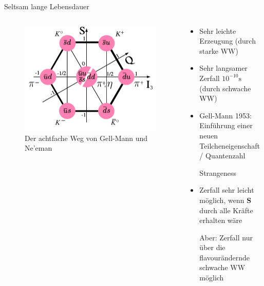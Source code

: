 \documentclass[aspectratio=1610, professionalfonts, 9pt, t]{beamer}
\begin{document}
  \begin{frame}{Seltsam lange Lebensdauer}
    \begin{columns}[onlytextwidth]
      \begin{column}{0.4\textwidth}
        \begin{figure}[ht]
          \begin{center}
            \includegraphics[height=0.6\textheight]{Images/Meson-octet.png} %
            \caption{Der achtfache Weg von Gell-Mann und Ne'eman}
          \end{center}
        \end{figure}
      \end{column}
      \begin{column}{0.5\textwidth}
        \begin{itemize}
          \item Sehr leichte Erzeugung (durch starke WW)
          \item Sehr langsamer Zerfall $10^{-10}\si{\second}$ (durch schwache WW)
          \item Gell-Mann 1953: Einführung einer neuen Teilcheneigenschaft/ Quantenzahl \item[\rightarrow] Strangeness
          \item Zerfall sehr leicht möglich, wenn \textbf{S} durch alle Kräfte erhalten wäre
          \item[Aber:] Zerfall nur über die flavourändernde schwache WW möglich
        \end{itemize}
      \end{column}
    \end{columns}
  \end{frame}
\end{document}
